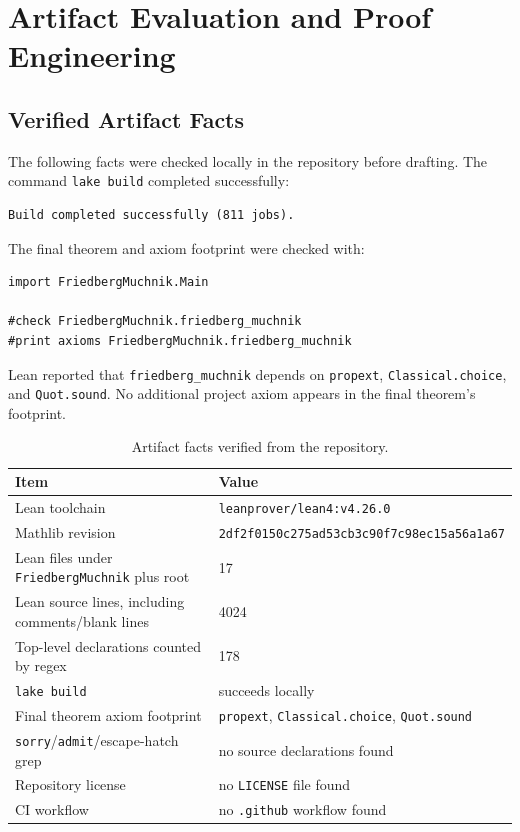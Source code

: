 \section{Artifact Evaluation and Proof Engineering}

\subsection{Verified Artifact Facts}

The following facts were checked locally in the repository before drafting.
The command \texttt{lake build} completed successfully:

\begin{verbatim}
Build completed successfully (811 jobs).
\end{verbatim}

The final theorem and axiom footprint were checked with:

\begin{lstlisting}
import FriedbergMuchnik.Main

#check FriedbergMuchnik.friedberg_muchnik
#print axioms FriedbergMuchnik.friedberg_muchnik
\end{lstlisting}

Lean reported that \texttt{friedberg\_muchnik} depends on
\texttt{propext}, \texttt{Classical.choice}, and \texttt{Quot.sound}.  No
additional project axiom appears in the final theorem's footprint.

\begin{table}
\centering
\begin{tabular}{ll}
\toprule
Item & Value \\
\midrule
Lean toolchain & \texttt{leanprover/lean4:v4.26.0} \\
Mathlib revision & \texttt{2df2f0150c275ad53cb3c90f7c98ec15a56a1a67} \\
Lean files under \texttt{FriedbergMuchnik} plus root & 17 \\
Lean source lines, including comments/blank lines & 4024 \\
Top-level declarations counted by regex & 178 \\
\texttt{lake build} & succeeds locally \\
Final theorem axiom footprint & \texttt{propext}, \texttt{Classical.choice}, \texttt{Quot.sound} \\
\texttt{sorry}/\texttt{admit}/escape-hatch grep & no source declarations found \\
Repository license & no \texttt{LICENSE} file found \\
CI workflow & no \texttt{.github} workflow found \\
\bottomrule
\end{tabular}
\caption{Artifact facts verified from the repository.}
\end{table}

